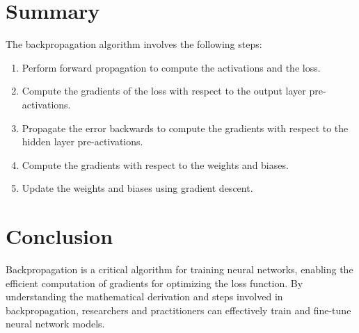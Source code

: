 \section{Summary}

The backpropagation algorithm involves the following steps:
\begin{enumerate}
    \item Perform forward propagation to compute the activations and the loss.
    \item Compute the gradients of the loss with respect to the output layer pre-activations.
    \item Propagate the error backwards to compute the gradients with respect to the hidden layer pre-activations.
    \item Compute the gradients with respect to the weights and biases.
    \item Update the weights and biases using gradient descent.
\end{enumerate}

\section{Conclusion}

Backpropagation is a critical algorithm for training neural networks, enabling the efficient computation of gradients for optimizing the loss function. By understanding the mathematical derivation and steps involved in backpropagation, researchers and practitioners can effectively train and fine-tune neural network models.

